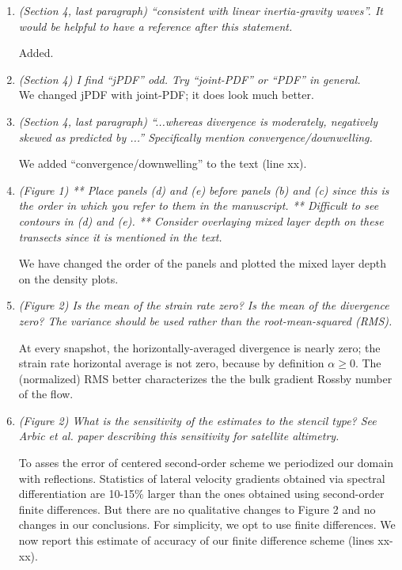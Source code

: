 \documentclass[11pt]{article}
\newcommand{\bdp}{\begin{description}}
\newcommand{\edp}{\end{description}}
\begin{document}
\begin{enumerate}
\item {\it (Section 4, last paragraph) ``consistent with linear inertia-gravity waves''.
        It would be
        helpful to have a reference after this statement.}

        \bdp
        Added.
        \edp

\item {\it (Section 4) I find “jPDF” odd. Try “joint-PDF” or “PDF” in general.}\\

We changed jPDF with joint-PDF; it does look much better.

\item {\it (Section 4, last paragraph) ``...whereas divergence is moderately, negatively skewed as
        predicted by ...'' Specifically mention convergence/downwelling.}

        \bdp
            We added ``convergence/downwelling'' to the text (line xx).
        \edp

\item {\it (Figure 1) ** Place panels (d) and (e) before panels (b) and (c) since this is the order
        in which you refer to them in the manuscript. ** Difficult to see contours in (d) and
        (e). ** Consider overlaying mixed layer depth on these transects since it is mentioned
        in the text.}

        \bdp
          We have changed the order of the panels and plotted the mixed layer depth
          on the density plots.
        \edp

\item {\it (Figure 2) Is the mean of the strain rate zero? Is the mean of the divergence zero? The
        variance should be used rather than the root-mean-squared (RMS).}

        \bdp
            At every snapshot, the horizontally-averaged divergence is nearly zero;
            the strain rate horizontal average is not zero, because by definition
            $\alpha \ge 0$. The (normalized) RMS better characterizes the the bulk
            gradient Rossby number of the flow.
        \edp


\item {\it (Figure 2) What is the sensitivity of the estimates to the stencil type? See Arbic et al.
        paper describing this sensitivity for satellite altimetry.}

        \bdp
            To asses the error of centered second-order scheme we periodized
            our domain with reflections. Statistics of lateral velocity gradients
            obtained via spectral differentiation are 10-15$\%$ larger than the ones
            obtained using second-order finite differences. But there are no qualitative
            changes to Figure 2 and no changes in our conclusions. For simplicity, we
            opt to use finite differences. We now report this estimate of accuracy of
            our finite difference scheme (lines xx-xx).
        \edp


\end{enumerate}
\end{document}
